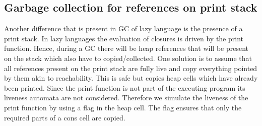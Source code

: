 \documentclass[9pt]{sigplanconf}
\newcommand{\comment}[1]{{\color{Myblue}{(#1)}}}
\newcommand{\cred}[1]{{\color{red}{#1}}}
\begin{document}
\subsection{Garbage collection for references on print stack}
Another  difference that is  present in  GC of  lazy language  is the
presence  of  a print  stack.  In  lazy  languages the  evaluation  of
closures is  driven by the print  function\comment{Refer to SPJ's
book}.  Hence, during  a GC there
will be heap  references that will be present on  the stack which also
have  to  copied/collected.   One  solution  is  to  assume  that  all
references  present  on  the  print  stack are  fully  live  and  copy
everything pointed  by them  akin to reachability.   This is  safe but
copies heap  cells which  have already been  printed. Since  the print
function is  not part of  the executing program its  liveness automata
are not  considered. Therefore we  simulate the liveness of  the print
function by using a flag in  the heap cell. The flag ensures that only
the required parts  of a cons cell are copied.\cred{Very sketchy: Make
  another attempt to write}

\end{document}

